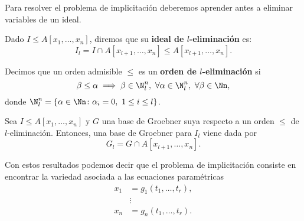 Para resolver el problema de implicitación deberemos aprender antes a eliminar variables de un ideal.
\begin{definicion}
    Dado $I\le A[x_1,\dots,x_n]$, diremos que su \textbf{ideal de $l$-eliminación} es:
    \begin{equation*}
        I_l = I \cap A[x_{l+1}, \dots, x_n] \le A[x_{l+1}, \dots, x_n].
    \end{equation*}
\end{definicion}

\begin{definicion}
    Decimos que un orden admisible $\le$ es un \textbf{orden de $l$-eliminación} si 
    $$\beta\le \alpha \implies \beta \in \N_l^n,\ \forall \alpha \in \N_l^n,\ \forall \beta \in \Nn,$$
    donde $\N_l^n = \{\alpha\in \Nn \colon \alpha_i =0,\ 1\le i \le l\}$.
\end{definicion}

\begin{teorema}[Eliminación]
    Sea $I\le A[x_1,\dots,x_n]$ y $G$ una base de Groebner suya respecto a un orden $\le$ de $l$-eliminación. Entonces, una base de Groebner para $I_l$ viene dada por
    \begin{equation*}
        G_l = G\cap A[x_{l+1},\dots, x_n].
    \end{equation*}
\end{teorema}


Con estos resultados podemos decir que el problema de implicitación consiste en encontrar la variedad asociada a las ecuaciones paramétricas
\begin{align*}
    x_1 &= g_1(t_1,\dots, t_r),\\
    &\vdots \\
    x_n &= g_n(t_1,\dots, t_r).
\end{align*}

